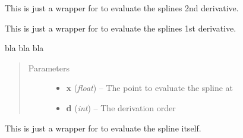 \documentclass[letterpaper,10pt,english]{sphinxmanual}
\begin{document}
\begin{fulllineitems}
\begin{fulllineitems}
\end{fulllineitems}


\begin{fulllineitems}
\label{pytrajectory:pytrajectory.spline.CubicSpline.ddf}
This is just a wrapper for {\hyperref[pytrajectory:pytrajectory.spline.CubicSpline.evalf]{}} to evaluate the splines 2nd derivative.

\end{fulllineitems}


\begin{fulllineitems}
\label{pytrajectory:pytrajectory.spline.CubicSpline.df}
This is just a wrapper for {\hyperref[pytrajectory:pytrajectory.spline.CubicSpline.evalf]{}} to evaluate the splines 1st derivative.

\end{fulllineitems}


\begin{fulllineitems}
\label{pytrajectory:pytrajectory.spline.CubicSpline.evalf}
bla bla bla
\begin{quote}\begin{description}
\item[{Parameters}] \leavevmode\begin{itemize}
\item {} 
\textbf{x} (\emph{float}) -- The point to evaluate the spline at

\item {} 
\textbf{d} (\emph{int}) -- The derivation order

\end{itemize}

\end{description}\end{quote}

\end{fulllineitems}


\begin{fulllineitems}
\label{pytrajectory:pytrajectory.spline.CubicSpline.f}
This is just a wrapper for {\hyperref[pytrajectory:pytrajectory.spline.CubicSpline.evalf]{}} to evaluate the spline itself.


\end{fulllineitems}
\end{fulllineitems}
\end{document}
